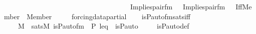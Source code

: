 \begin{isabellebody}
\ \ \ \ \ \ \ \ \ \ \ \ \ \ \ \ \ \ \ \ \ \ \ \ \ \ \ \ \ \ \ \ \ \ \ \ Implies{\isacharparenleft}{\kern0pt}pair{\isacharunderscore}{\kern0pt}fm{\isacharparenleft}{\kern0pt}{}{\isacharcomma}{\kern0pt}\ {}{\isacharcomma}{\kern0pt}\ {}{\isacharparenright}{\kern0pt}{\isacharcomma}{\kern0pt}\ Implies{\isacharparenleft}{\kern0pt}pair{\isacharunderscore}{\kern0pt}fm{\isacharparenleft}{\kern0pt}{}{\isacharcomma}{\kern0pt}\ {}{\isacharcomma}{\kern0pt}\ {}{\isacharparenright}{\kern0pt}{\isacharcomma}{\kern0pt}\ Iff{\isacharparenleft}{\kern0pt}Member{\isacharparenleft}{\kern0pt}{}{\isacharcomma}{\kern0pt}\ {}{\isacharparenright}{\kern0pt}{\isacharcomma}{\kern0pt}\ Member{\isacharparenleft}{\kern0pt}{}{\isacharcomma}{\kern0pt}\ {}{\isacharparenright}{\kern0pt}{\isacharparenright}{\kern0pt}{\isacharparenright}{\kern0pt}{\isacharparenright}{\kern0pt}{\isacharparenright}{\kern0pt}{\isacharparenright}{\kern0pt}{\isacharparenright}{\kern0pt}{\isacharparenright}{\kern0pt}{\isacharparenright}{\kern0pt}{\isacharparenright}{\kern0pt}{\isacharparenright}{\kern0pt}{\isacharparenright}{\kern0pt}{\isacharparenright}{\kern0pt}{\isacharparenright}{\kern0pt}{\isacharparenright}{\kern0pt}\ \ {\isachardoublequoteclose}\ \isanewline
\isanewline
{}\isamarkupfalse%
\ forcing{\isacharunderscore}{\kern0pt}data{\isacharunderscore}{\kern0pt}partial\ \isanewline
{}\ \isanewline
\isanewline
{}\isamarkupfalse%
\ is{\isacharunderscore}{\kern0pt}P{\isacharunderscore}{\kern0pt}auto{\isacharunderscore}{\kern0pt}fm{\isacharunderscore}{\kern0pt}sats{\isacharunderscore}{\kern0pt}iff\ {\isacharcolon}{\kern0pt}\ \isanewline
\ \ {\isachardoublequoteopen}{\isasympi}\ {\isasymin}\ M\ {\isasymLongrightarrow}\ sats{\isacharparenleft}{\kern0pt}M{\isacharcomma}{\kern0pt}\ is{\isacharunderscore}{\kern0pt}P{\isacharunderscore}{\kern0pt}auto{\isacharunderscore}{\kern0pt}fm{\isacharcomma}{\kern0pt}\ {\isacharbrackleft}{\kern0pt}{\isasympi}{\isacharcomma}{\kern0pt}\ P{\isacharcomma}{\kern0pt}\ leq{\isacharbrackright}{\kern0pt}{\isacharparenright}{\kern0pt}\ {\isasymlongleftrightarrow}\ is{\isacharunderscore}{\kern0pt}P{\isacharunderscore}{\kern0pt}auto{\isacharparenleft}{\kern0pt}{\isasympi}{\isacharparenright}{\kern0pt}{\isachardoublequoteclose}\ \isanewline
%
\isadelimproof
\isanewline
\ \ %
\endisadelimproof
%
\isatagproof
{}\isamarkupfalse%
\ is{\isacharunderscore}{\kern0pt}P{\isacharunderscore}{\kern0pt}auto{\isacharunderscore}{\kern0pt}def\isanewline

\end{isabellebody}
